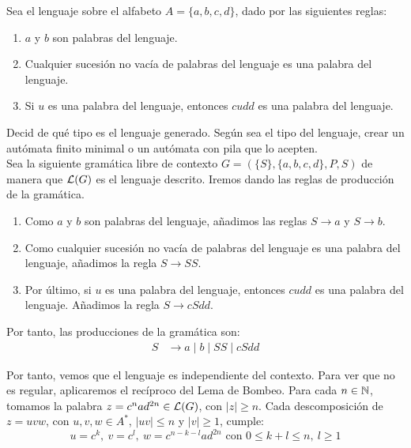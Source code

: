 \begin{ejercicio}\label{ej:1.5.22}
    Sea el lenguaje sobre el alfabeto $A = \{a,b,c,d\}$, dado por las siguientes reglas:
    \begin{enumerate}
        \item $a$ y $b$ son palabras del lenguaje.
        \item Cualquier sucesión no vacía de palabras del lenguaje es una palabra del lenguaje.
        \item Si $u$ es una palabra del lenguaje, entonces $cudd$ es una palabra del lenguaje.
    \end{enumerate}
    Decid de qué tipo es el lenguaje generado. Según sea el tipo del lenguaje, crear un autómata finito minimal o un autómata con pila que lo acepten.\\

    Sea la siguiente gramática libre de contexto $G = (\{S\},\{a,b,c,d\},P,S)$ de manera que $\mathcal{L}(G)$ es el lenguaje descrito. Iremos dando las reglas de producción de la gramática.
    \begin{enumerate}
        \item Como $a$ y $b$ son palabras del lenguaje, añadimos las reglas $S\to a$ y $S\to b$.

        \item Como cualquier sucesión no vacía de palabras del lenguaje es una palabra del lenguaje, añadimos la regla $S\to SS$.

        \item Por último, si $u$ es una palabra del lenguaje, entonces $cudd$ es una palabra del lenguaje. Añadimos la regla $S\to cSdd$.
    \end{enumerate}

    Por tanto, las producciones de la gramática son:
    \begin{align*}
        S&\to a\mid b\mid SS\mid cSdd
    \end{align*}

    Por tanto, vemos que el lenguaje es independiente del contexto. Para ver que no es regular, aplicaremos el recíproco del Lema de Bombeo. Para cada $n\in \mathbb{N}$, tomamos la palabra $z = c^nad^{2n}\in \mathcal{L}(G)$, con $|z|\geq n$. Cada descomposición de $z=uvw$, con $u,v,w\in A^*$, $|uv|\leq n$ y $|v|\geq 1$, cumple:
    \begin{equation*}
        u=c^k,\ v=c^l,\ w=c^{n-k-l}ad^{2n} \text{\ con\ } 0\leq k+l\leq n,\ l\geq 1
    \end{equation*}


\end{ejercicio}
